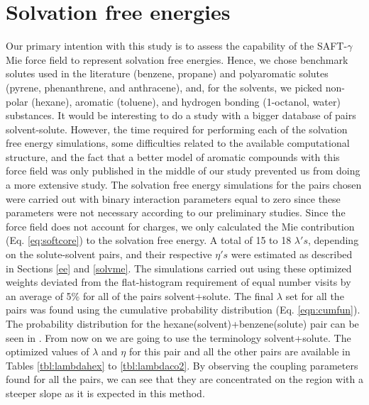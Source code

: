 \section{Solvation free energies}
Our primary intention with this study is to assess the capability of the SAFT-$\gamma$ Mie force field to represent solvation free energies. Hence, we chose benchmark solutes used in the literature (benzene, propane) and polyaromatic solutes (pyrene, phenanthrene, and anthracene), and, for the solvents, we picked non-polar (hexane), aromatic (toluene), and hydrogen bonding (1-octanol, water) substances. It would be interesting to do a study with a bigger database of pairs solvent-solute. However, the time required for performing each of the solvation free energy simulations, some difficulties related to the available computational structure, and the fact that a better model of aromatic compounds with this force field was only published in the middle of our study prevented us from doing a more extensive study. The solvation free energy simulations for the pairs chosen were carried out with binary interaction parameters equal to zero since these parameters were not necessary according to our preliminary studies. Since the force field does not account for charges, we only calculated the Mie contribution (Eq. \eqref{eq:softcore}) to the solvation free energy. A total of 15 to 18 $\lambda 's$, depending on the solute-solvent pairs, and their respective $\eta 's$ were estimated as described in Sections \ref{ee} and \ref{solvme}. The simulations carried out using these optimized weights deviated from the flat-histogram requirement of equal number visits by an average of 5\% for all of the pairs solvent+solute. The final $\lambda$ set for all the pairs was found using the cumulative probability distribution (Eq. \eqref{eqn:cumfun}). The probability distribution for the hexane(solvent)+benzene(solute) pair can be seen in . From now on we are going to use the terminology solvent+solute. The optimized values of $\lambda$ and $\eta$ for this pair and all the other pairs are available in Tables \ref{tbl:lambdahex} to \ref{tbl:lambdaco2}. By observing the coupling parameters found for all the pairs, we can see that they are concentrated on the region with a steeper slope as it is expected in this method.

